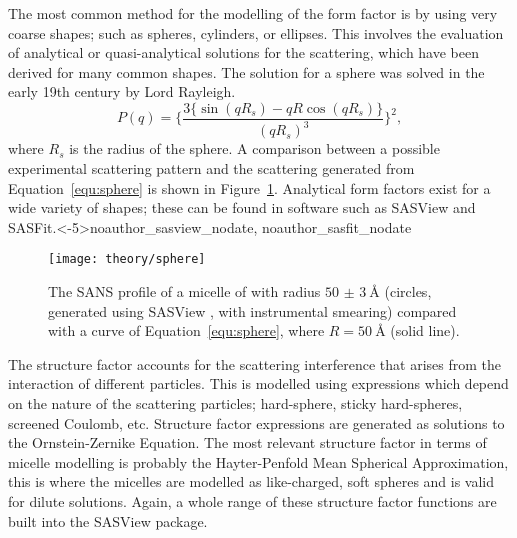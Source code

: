 The most common method for the modelling of the form factor is by using very coarse shapes; such as spheres, cylinders, or ellipses.
This involves the evaluation of analytical or quasi-analytical solutions for the scattering, which have been derived for many common shapes.
The solution for a sphere was solved in the early 19th century by Lord Rayleigh.\autocite{pedersen_monte_2002}
%
\begin{equation}
    P(q) = \Bigg\{\frac{3\big\{\sin(qR_s) - qR\cos(qR_s)\big\}}{(qR_s)^3}\Bigg\}^2,
    \label{equ:sphere}
\end{equation}
%
where $R_s$ is the radius of the sphere.
A comparison between a possible experimental scattering pattern and the scattering generated from Equation~\ref{equ:sphere} is shown in Figure~\ref{fig:sphere}.
Analytical form factors exist for a wide variety of shapes; these can be found in software such as SASView and SASFit.\sidecite<-5\baselineskip>{noauthor_sasview_nodate, noauthor_sasfit_nodate}
%
\begin{figure}
    \centering
    \texttt{[image: theory/sphere]}
    \caption{The SANS profile of a micelle of  with radius $\SI{50(3)}{\angstrom}$ (circles, generated using SASView \cite{noauthor_sasview_nodate}, with instrumental smearing) compared with a curve of Equation~\protect\ref{equ:sphere}, where $R = \SI{50}{\angstrom}$ (solid line).}
    \label{fig:sphere}
\end{figure}
%

The structure factor accounts for the scattering interference that arises from the interaction of different particles.
This is modelled using expressions which depend on the nature of the scattering particles; hard-sphere, sticky hard-spheres, screened Coulomb, etc.
Structure factor expressions are generated as solutions to the Ornstein-Zernike Equation.\autocite{klein_interacting_2002}
The most relevant structure factor in terms of micelle modelling is probably the Hayter-Penfold Mean Spherical Approximation, \autocite{hayter_analytic_1981} this is where the micelles are modelled as like-charged, soft spheres and is valid for dilute solutions.
Again, a whole range of these structure factor functions are built into the SASView package.\autocite{noauthor_sasview_nodate}

